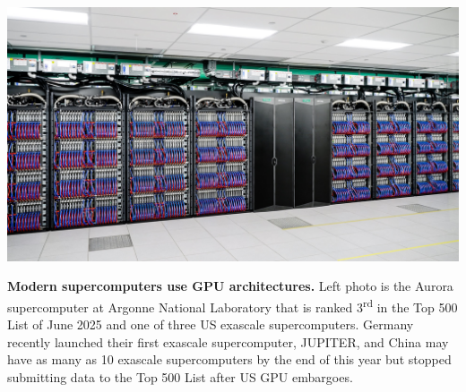 \documentclass{article}
\begin{document}
\begin{tcbposter}
{  \noindent
  \begin{minipage}[c]{.3\linewidth}
    \includegraphics[width=\linewidth]{1920x1080-Aurora hero image.jpg}
  \end{minipage}
  \begin{minipage}[c]{.7\linewidth}
    \textbf{Modern supercomputers use GPU architectures.}
    Left photo is the Aurora supercomputer at Argonne National Laboratory %
    that is ranked 3\textsuperscript{rd} in the Top 500 List of June 2025 %
    and one of three US exascale supercomputers.
    Germany recently launched their first exascale supercomputer, JUPITER, %
    and China may have as many as 10 exascale supercomputers %
    by the end of this year\supercite{dongarra_2023} %
    but stopped submitting data to the Top 500 List %
    after US GPU embargoes.
  \end{minipage}

  \vspace{-.5\baselineskip}
}
\end{tcbposter}
\end{document}
